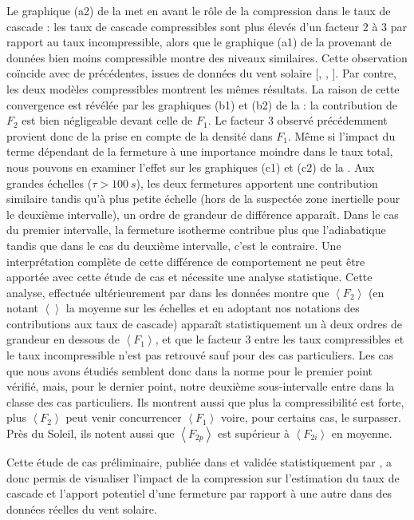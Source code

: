  Le graphique (a2) de la  met en avant le rôle de la compression dans le taux de cascade : les taux de cascade compressibles sont plus élevés d'un facteur 2 à 3 par rapport au taux incompressible, alors que le graphique (a1) de la  provenant de données bien moins compressible montre des niveaux similaires. Cette observation coïncide avec de précédentes, issues de données du vent solaire [\cite{banerjee_scaling_2016}, \cite{hadid_energy_2017}, \cite{andres_evolution_2021}]. Par contre, les deux modèles compressibles montrent les mêmes résultats. La raison de cette convergence est révélée par les graphiques (b1) et (b2) de la  : la contribution de $F_2$ est bien négligeable devant celle de $F_1$. Le facteur 3 observé précédemment provient donc de la prise en compte de la densité dans $F_1$.  Même si l'impact du terme dépendant de la fermeture à une importance moindre dans le taux total, nous pouvons en examiner l'effet sur les graphiques (c1) et (c2) de la . Aux grandes échelles ($\tau > \SI{100}{s}$), les deux fermetures apportent une contribution similaire tandis qu'à plus petite échelle (hors de la suspectée zone inertielle pour le deuxième intervalle), un ordre de grandeur de différence apparaît. Dans le cas du premier intervalle, la fermeture isotherme contribue plus que l'adiabatique tandis que dans le cas du deuxième intervalle, c'est le contraire. Une interprétation complète de cette différence de comportement ne peut être apportée avec cette étude de cas et nécessite une analyse statistique. Cette analyse, effectuée ultérieurement par \cite{brodiano_statistical_2022} dans les données  montre que $\left<F_2\right>$ (en notant $\left<\right>$ la moyenne sur les échelles et en adoptant nos notations des contributions aux taux de cascade) apparaît statistiquement un à deux ordres de grandeur en dessous de $\left<F_1\right>$, et que le facteur $\num{3}$ entre les taux compressibles et le taux incompressible n'est pas retrouvé sauf pour des cas particuliers. Les cas que nous avons étudiés semblent donc dans la norme pour le premier point vérifié, mais, pour le dernier point, notre deuxième sous-intervalle entre dans la classe des cas particuliers. Ils montrent aussi que plus la compressibilité est forte, plus $\left<F_2\right>$ peut venir concurrencer $\left<F_1\right>$ voire, pour certains cas, le surpasser. Près du Soleil, ils notent aussi que $\left<F_{2p}\right>$ est supérieur à $\left<F_{2i}\right>$ en moyenne.

Cette étude de cas préliminaire, publiée dans \cite{simon_general_2021} et validée statistiquement par \cite{brodiano_statistical_2022}, a donc permis de visualiser l'impact de la compression sur l'estimation du taux de cascade et l'apport potentiel d'une fermeture par rapport à une autre dans des données réelles du vent solaire. 

